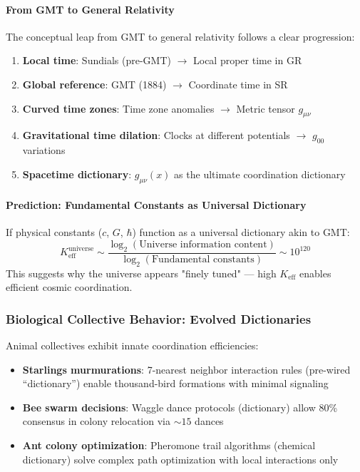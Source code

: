 \documentclass[11pt,a4paper]{article}
\begin{document}
	\paragraph{From GMT to General Relativity}
	The conceptual leap from GMT to general relativity follows a clear progression:
	\begin{enumerate}
		\item \textbf{Local time}: Sundials (pre-GMT) $\rightarrow$ Local proper time in GR
		\item \textbf{Global reference}: GMT (1884) $\rightarrow$ Coordinate time in SR
		\item \textbf{Curved time zones}: Time zone anomalies $\rightarrow$ Metric tensor $g_{\mu\nu}$
		\item \textbf{Gravitational time dilation}: Clocks at different potentials $\rightarrow$ $g_{00}$ variations
		\item \textbf{Spacetime dictionary}: $g_{\mu\nu}(x)$ as the ultimate coordination dictionary
	\end{enumerate}
	
	\paragraph{Prediction: Fundamental Constants as Universal Dictionary}
	If physical constants ($c$, $G$, $\hbar$) function as a universal dictionary akin to GMT:
	\begin{equation}
		K_{\mathrm{eff}}^{\mathrm{universe}} \sim \frac{\log_2(\text{Universe information content})}{\log_2(\text{Fundamental constants})} \sim 10^{120}
	\end{equation}
	This suggests why the universe appears "finely tuned" — high $K_{\mathrm{eff}}$ enables efficient cosmic coordination.
	
	\subsubsection{Biological Collective Behavior: Evolved Dictionaries}
	Animal collectives exhibit innate coordination efficiencies:
	\begin{itemize}
		\item \textbf{Starlings murmurations}: 7-nearest neighbor interaction rules (pre-wired ``dictionary'') enable thousand-bird formations with minimal signaling
		\item \textbf{Bee swarm decisions}: Waggle dance protocols (dictionary) allow 80\% consensus in colony relocation via $\sim 15$ dances
		\item \textbf{Ant colony optimization}: Pheromone trail algorithms (chemical dictionary) solve complex path optimization with local interactions only
	\end{itemize}
	
\end{document}
